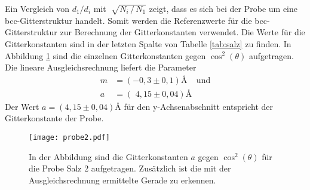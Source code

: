 Ein Vergleich von $d_1 / d_i$ mit $\sqrt[]{N_i\, / \, N_1}$ zeigt, dass es sich bei der Probe um eine bcc-Gitterstruktur handelt.
Somit werden die
Referenzwerte für die bcc-Gitterstruktur zur Berechnung der Gitterkonstanten verwendet. Die Werte für die Gitterkonstanten sind in der letzten Spalte von
Tabelle \ref{tab:salz} zu finden. In Abbildung \ref{abb:salz} sind die einzelnen Gitterkonstanten gegen $\cos^2(\theta)$ aufgetragen. Die lineare Ausgleichsrechnung liefert
die Parameter
\begin{align*}
  m &= \left(-0,3\pm0,1\right)\si{\angstrom}~~~~~\text{und}\\
  a &= \left(\,\,4,15\pm0,04\right)\si{\angstrom}
\end{align*}
Der Wert $a = \left(4,15\pm0,04\right)\si{\angstrom}$ für den y-Achsenabschnitt entspricht der Gitterkonstante der Probe.

\begin{figure}[H]
  \centering
  \texttt{[image: probe2.pdf]}
  \caption{In der Abbildung sind die Gitterkonstanten $a$ gegen $\cos^2(\theta)$ für die Probe Salz 2 aufgetragen. Zusätzlich ist die mit der Ausgleichsrechnung
  ermittelte Gerade zu erkennen.}
  \label{abb:salz}
\end{figure}
